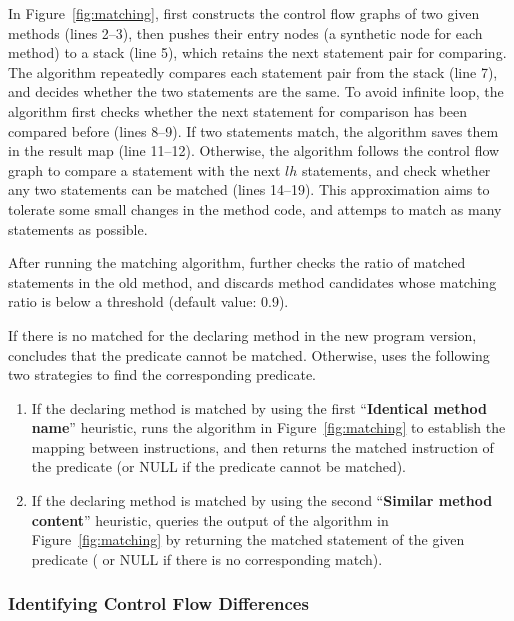 In Figure~\ref{fig:matching}, \ourtool first constructs the control
flow graphs of two given methods (lines 2--3), then pushes their
entry nodes (a synthetic node for each method) to a stack (line 5), which retains
the next statement pair for comparing. The algorithm repeatedly
compares each statement pair from the stack (line 7), and
decides whether the two statements are the same. To avoid infinite
loop, the algorithm first checks whether the next statement for comparison
has been compared before (lines 8--9). If two statements match,
the algorithm saves them in the result map (line 11--12). Otherwise,
the algorithm follows the control flow graph to compare a statement with
the next $lh$ statements, and check whether any two statements can be
matched (lines 14--19). This approximation aims to tolerate some small
changes in the method code, and attemps to match as many statements as possible.

After running the matching algorithm, \ourtool further checks the ratio of
matched statements in the old method, and discards method candidates whose
matching ratio is below a threshold (default value: 0.9).

If there is no matched for the declaring method in the new program
version, \ourtool concludes that the predicate cannot be
matched. Otherwise, \ourtool uses the following two strategies
to find the corresponding predicate.

\begin{enumerate}
\item If the declaring method is matched by using the first
``\textbf{Identical method name}'' heuristic, \ourtool runs the algorithm
in Figure~\ref{fig:matching} to establish the mapping between
instructions, and then returns the matched instruction of the
predicate (or NULL if the predicate cannot be matched).
\item If the declaring method is matched by using the second
``\textbf{Similar method content}'' heuristic,  \ourtool
queries the output of the algorithm in Figure~\ref{fig:matching}
by returning the matched statement of the given predicate (
or NULL if there is no corresponding match).
\end{enumerate}




\subsubsection{Identifying Control Flow Differences}
\label{sec:identify_diff}

